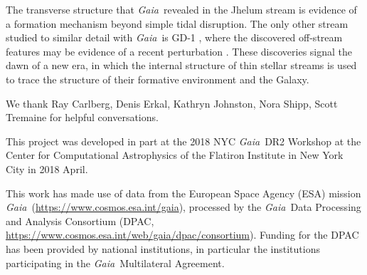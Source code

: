 \documentclass[twocolumn]{aastex62}
\newcommand{\acronym}[1]{{\small{#1}}}
\newcommand{\gaia}{\textsl{Gaia}}
\begin{document}
The transverse structure that \gaia\ revealed in the Jhelum stream is evidence of a formation mechanism beyond simple tidal disruption.
The only other stream studied to similar detail with \gaia\ is GD-1 \citep{pwb}, where the discovered off-stream features may be evidence of a recent perturbation \citep{bonaca2018}.
These discoveries signal the dawn of a new era, in which the internal structure of thin stellar streams is used to trace the structure of their formative environment and the Galaxy.

\vspace{0.5cm}
\acknowledgements
We thank Ray Carlberg, Denis Erkal, Kathryn Johnston, Nora Shipp, Scott Tremaine for helpful conversations.

This project was developed in part at the 2018 \acronym{NYC} \gaia\ \acronym{DR2} Workshop at the Center for Computational Astrophysics of the Flatiron Institute in New York City in 2018 April.

This work has made use of data from the European Space Agency (\acronym{ESA}) mission \gaia\ (\url{https://www.cosmos.esa.int/gaia}), processed by the \gaia\ Data Processing and Analysis Consortium (\acronym{DPAC}, \url{https://www.cosmos.esa.int/web/gaia/dpac/consortium}). Funding for the \acronym{DPAC} has been provided by national institutions, in particular the institutions participating in the \gaia\ Multilateral Agreement.
\end{document}
